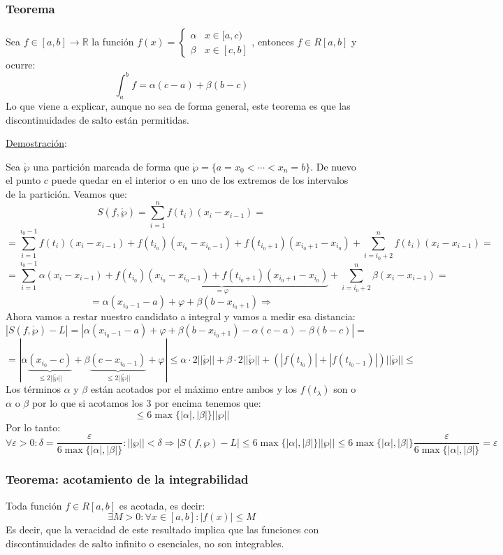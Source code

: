 \documentclass[10pt,a4paper,openright]{book}
\begin{document}
\subsubsection*{Teorema}
Sea $f\in[a,b]\rightarrow \mathbb R$ la función $f(x)=\begin{cases}\alpha & x\in [a,c) \\ \beta & x\in [c,b]\end{cases}$, entonces $f\in R[a,b]$ y ocurre:
$$\int_a^b f = \alpha (c-a)+\beta(b-c)$$
Lo que viene a explicar, aunque no sea de forma general, este teorema es que las discontinuidades de salto están permitidas.

\underline{Demostración}:

Sea $\mathring{\wp}$ una partición marcada de forma que $\mathring{\wp} = \{a=x_0 < \cdots <x_n = b\}$. De nuevo el punto $c$ puede quedar en el interior o en uno de los extremos de los intervalos de la partición. Veamos que:
$$S(f,\mathring{\wp}) = \sum_{i=1}^n f(t_i)(x_i-x_{i-1}) = $$
$$=\sum_{i=1}^{i_0-1}f(t_i)(x_i-x_{i-1})+f(t_{i_0})(x_{i_0}-x_{i_0-1})+ f(t_{i_0+1})(x_{i_0+1}-x_{i_0})+\sum_{i=i_0+2}^n f(t_i)(x_i-x_{i-1}) = $$
$$= \sum_{i=1}^{i_0-1}\alpha(x_i-x_{i-1})+\underbrace{f(t_{i_0})(x_{i_0}-x_{i_0-1})+ f(t_{i_0+1})(x_{i_0+1}-x_{i_0})}_{=\varphi}+\sum_{i=i_0+2}^n \beta(x_i-x_{i-1})=$$
$$=\alpha(x_{i_0-1}-a)+\varphi+\beta(b-x_{i_0+1})\Rightarrow $$
Ahora vamos a restar nuestro candidato a integral y vamos a medir esa distancia:
$$\left|S(f,\mathring{\wp})-L \right| =\left|\alpha(x_{i_0-1}-a)+\varphi + \beta(b-x_{i_0+1})-\alpha (c-a)-\beta (b-c)\right| = $$
$$=\left| \alpha \underbrace{(x_{i_0}-c)}_{\leq 2||\mathring{\wp}||}+\beta \underbrace{(c-x_{i_0-1})}_{\leq 2||\mathring{\wp}||} + \varphi\right| \leq \alpha\cdot 2||\mathring{\wp}||+ \beta \cdot 2||\mathring{\wp}|| + \left( |f(t_{i_0})|+|f(t_{i_0-1})| \right)||\mathring{\wp}|| \leq$$
Los términos $\alpha$ y $\beta$ están acotados por el máximo entre ambos y los $f(t_\lambda)$ son o $\alpha$ o $\beta$ por lo que si acotamos los 3 por encima tenemos que:
$$\leq 6 \max\{|\alpha|,|\beta|\}||\wp||$$
Por lo tanto:
$$\forall \varepsilon >0 : \delta = \frac{\varepsilon}{6\max\{|\alpha|, |\beta|\}}: ||\wp||<\delta\Rightarrow \left|S(f,\wp)-L\right|\leq 6 \max\{|\alpha|,|\beta|\}||\wp|| \leq 6 \max\{|\alpha|,|\beta|\} \frac{\varepsilon}{6\max\{|\alpha|, |\beta|\}} = \varepsilon$$

\subsubsection*{Teorema: acotamiento de la integrabilidad}
Toda función $f\in R[a,b]$ es acotada, es decir:
$$\exists M>0:\forall x\in [a,b] :|f(x)|\leq M$$
Es decir, que la veracidad de este resultado implica que las funciones con discontinuidades de salto infinito o esenciales, no son integrables.
\end{document}
